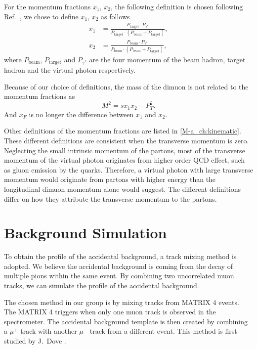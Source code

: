 \documentclass[../main.tex]{subfiles}
\begin{document}
For the momentum fractions $x_1$, $x_2$, the following definition is chosen following Ref.~\cite{Coester-1286},
we chose to define $x_1$, $x_2$ as follows
\begin{equation}
    \begin{split}
        x_1 &= \frac{P_{\textrm{target}}\cdot P_{\gamma^*}}{P_{\textrm{target}}\cdot (P_{\textrm{beam}}+P_{\textrm{target}})},\\
        x_2 &= \frac{P_{\textrm{beam}}\cdot P_{\gamma^*}}{P_{\textrm{beam}}\cdot (P_{\textrm{beam}}+P_{\textrm{target}})},
    \end{split}
\end{equation}
where $P_{\textrm{beam}}$, $P_{\textrm{target}}$ and $P_{\gamma^*}$ are the four momentum of the 
beam hadron, target hadron and the virtual photon respectively.

Because of our choice of definitions, the mass of the dimuon is not related to the momentum fractions as
\begin{equation}
	M^2= sx_1x_2-P_T^2.
\end{equation}
And $x_F$ is no longer the difference between $x_1$ and $x_2$.

Other definitions of the momentum fractions are listed in \cref{M-a_ch:kinematic}. These different definitions 
are consistent when the transverse momentum is zero. Neglecting the small intrinsic momentum of the partons,
most of the transverse momentum of the virtual photon originates from higher order QCD effect, such as gluon
emission by the quarks. Therefore, a virtual photon with large transverse momentum would originate
from partons with higher energy than the longitudinal dimuon momentum alone would suggest. The different
definitions differ on how they attribute the transverse momentum to the partons.

\section{Background Simulation}
\label{sec:mixing}
To obtain the profile of the accidental background, a track mixing method is adopted.
We believe the accidental background is coming from the decay of multiple pions within 
the same event. By combining two uncorrelated muon tracks, we can simulate the profile
of the accidental background.

The chosen method in our group is by mixing tracks from MATRIX 4 events. The MATRIX 4 triggers when
only one muon track is observed in the spectrometer.
The accidental background template is then created by combining a $\mu^+$ track with
another $\mu^-$ track from a different event. This method is first studied by 
J.~Dove \cite{dove2020}. 
\end{document}
